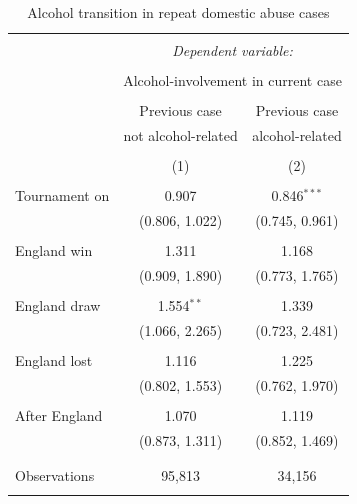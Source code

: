 \documentclass[12pt, a4paper]{article}
\begin{document}
\begin{table}
\centering
 \caption{Alcohol transition in repeat domestic abuse cases}
  \label{alcohol_transition}
  \begin{threeparttable}
\begin{tabular}{@{\extracolsep{5pt}}lcc} 
\\[-1.8ex]\hline 
\hline \\[-1.8ex] 
 & \multicolumn{2}{c}{\textit{Dependent variable:}} \\ 
\cline{2-3} 
\\[-1.8ex] & \multicolumn{2}{c}{Alcohol-involvement in current case} \\ 
\\[-1.8ex] & Previous case & Previous case\\
& not alcohol-related & alcohol-related\\ 
\\[-1.8ex] & (1) & (2)\\ 
\hline \\[-1.8ex] 
 Tournament on & 0.907 & 0.846$^{***}$ \\ 
  & (0.806, 1.022) & (0.745, 0.961) \\ 
  & & \\ 
 England win & 1.311 & 1.168 \\ 
  & (0.909, 1.890) & (0.773, 1.765) \\ 
  & & \\ 
 England draw & 1.554$^{**}$ & 1.339 \\ 
  & (1.066, 2.265) & (0.723, 2.481) \\ 
  & & \\ 
 England lost & 1.116 & 1.225 \\ 
  & (0.802, 1.553) & (0.762, 1.970) \\ 
  & & \\ 
 After England & 1.070 & 1.119 \\ 
  & (0.873, 1.311) & (0.852, 1.469) \\ 
  & & \\ 
\hline \\[-1.8ex] 
Observations & 95,813 & 34,156 \\ 
\hline 
\hline \\[-1.8ex] 
\end{tabular} 

\end{threeparttable}
\end{table}
\end{document}
